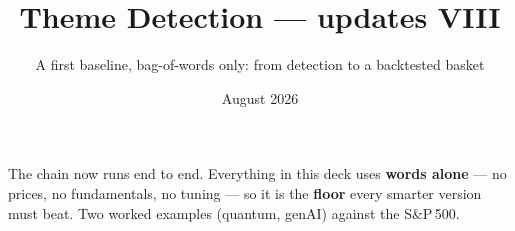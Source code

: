 \documentclass[10pt,aspectratio=169]{beamer}
\title{Theme Detection --- updates VIII}
\subtitle{A first baseline, bag-of-words only: from detection to a backtested basket}
\date{August 2026}
\begin{document}
\begin{frame}[plain]
  \titlepage
  \vspace{-1.9cm}
  \begin{center}\scriptsize
  \begin{minipage}{0.88\textwidth}\centering
  The chain now runs end to end. Everything in this deck uses \textbf{words alone} ---
  no prices, no fundamentals, no tuning --- so it is the \textbf{floor} every smarter
  version must beat. Two worked examples (quantum, genAI) against the S\&P\,500.
  \end{minipage}
  \end{center}
\end{frame}

\end{document}
